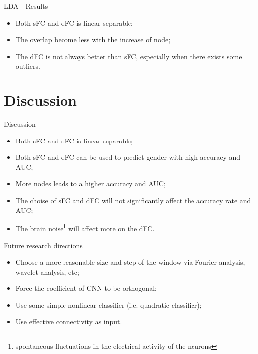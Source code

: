 \documentclass{beamer}
\begin{document}

\begin{frame}{LDA - Results}

    \begin{itemize}
        \item Both sFC and dFC is linear separable;
        \item The overlap become less with the increase of node;
        \item The dFC is not always better than sFC, especially when there exists some outliers.
    \end{itemize}

\end{frame}

\section{Discussion}
\begin{frame}{Discussion}

    \begin{itemize}
        \item Both sFC and dFC is linear separable;
        \item Both sFC and dFC can be used to predict gender with high accuracy and AUC;
        \item More nodes leads to a higher accuracy and AUC;
        \item The choise of sFC and dFC will not significantly affect the accuracy rate and AUC;
        \item The brain noise\footnote{spontaneous fluctuations in the electrical activity of the neurons} will affect more on the dFC.
    \end{itemize}

\end{frame}

\begin{frame}{Future research directions}

    \begin{itemize}
        \item Choose a more reasonable size and step of the window via Fourier analysis, wavelet analysis, etc;
        \item Force the coefficient of CNN to be orthogonal;
        \item Use some simple nonlinear classifier (i.e. quadratic classifier);
        \item Use effective connectivity as input.
    \end{itemize}

\end{frame}
\end{document}
